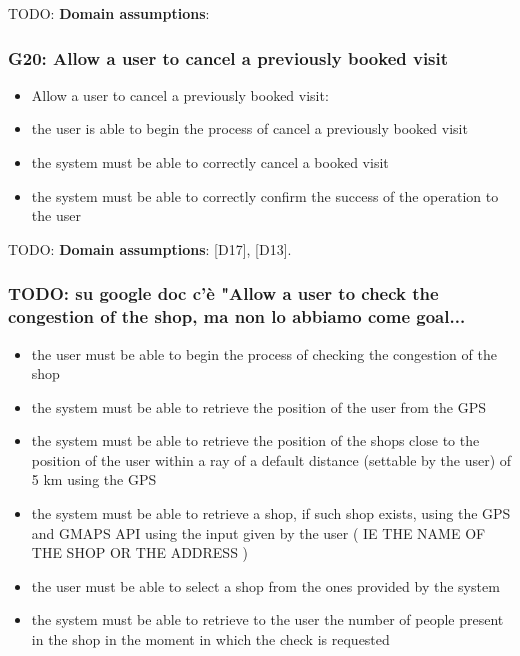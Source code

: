 TODO: \textbf{Domain assumptions}: 

\subsubsection{G20: Allow a user to cancel a previously booked visit}
\label{subsubsect:G20}

\begin{itemize}[topsep=0pt]
    \item Allow a user to cancel a previously booked visit:
    \item the user is able to begin the process of cancel a previously booked visit
    \item the system must be able to correctly cancel a booked visit
    \item the system must be able to correctly confirm the success of the operation to the user
\end{itemize}

TODO: \textbf{Domain assumptions}: [D17], [D13]. 

\subsubsection{TODO: su google doc c'è "Allow a user to check the congestion of the shop, ma non lo abbiamo come goal...}
\label{subsubsect:TODO}

\begin{itemize}[topsep=0pt]
    \item the user must be able to begin the process of checking the congestion of the shop
    \item the system must be able to retrieve the position of the user from the GPS
    \item the system must be able to retrieve the position of the shops close to the position of the user within a ray of a default distance (settable by the user) of 5 km using the GPS
    \item the system must be able to retrieve a shop, if such shop exists, using the GPS  and GMAPS API using the input given by the user ( IE THE NAME OF THE SHOP OR THE ADDRESS )
    \item the user must be able to select a shop from the ones provided by the system
    \item the system must be able to retrieve to the user the number of people present in the shop in the moment in which the check is requested
\end{itemize}

